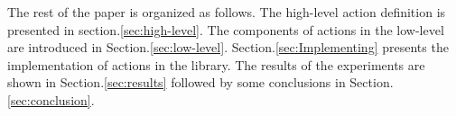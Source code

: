 % 
% 
% 

The rest of the paper is organized as follows.
The high-level action definition is presented in section.\ref{sec:high-level}.
The components of actions in the low-level are introduced in Section.\ref{sec:low-level}.
Section.\ref{sec:Implementing} presents the implementation of actions in the library.
The results of the experiments are shown in Section.\ref{sec:results} followed by some conclusions in Section.\ref{sec:conclusion}.

